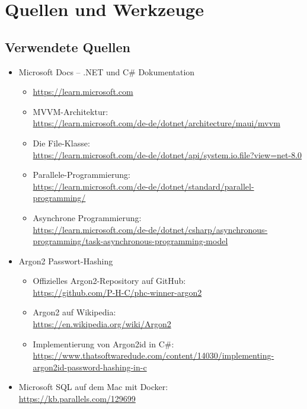 \clearpage
\section*{Quellen und Werkzeuge}

\vspace{1cm}

\subsection*{Verwendete Quellen}
\begin{itemize}
\item Microsoft Docs – .NET und C\# Dokumentation
\begin{itemize}
    \item \url{https://learn.microsoft.com}
    \item MVVM-Architektur: \\ \url{https://learn.microsoft.com/de-de/dotnet/architecture/maui/mvvm}
    \item Die File-Klasse: \\ \url{https://learn.microsoft.com/de-de/dotnet/api/system.io.file?view=net-8.0}
    \item Parallele-Programmierung: \\ \url{https://learn.microsoft.com/de-de/dotnet/standard/parallel-programming/}
     \item Asynchrone Programmierung: \\ \url{https://learn.microsoft.com/de-de/dotnet/csharp/asynchronous-programming/task-asynchronous-programming-model}
\end{itemize}

    \item Argon2 Passwort-Hashing
    \begin{itemize}
        \item Offizielles Argon2-Repository auf GitHub: \\ \url{https://github.com/P-H-C/phc-winner-argon2}
        \item Argon2 auf Wikipedia: \\ \url{https://en.wikipedia.org/wiki/Argon2}
        \item Implementierung von Argon2id in C\#: \\ \url{https://www.thatsoftwaredude.com/content/14030/implementing-argon2id-password-hashing-in-c}
    \end{itemize}

   
   \item Microsoft SQL auf dem Mac mit Docker: \\
   \url{https://kb.parallels.com/129699}


\end{itemize}
